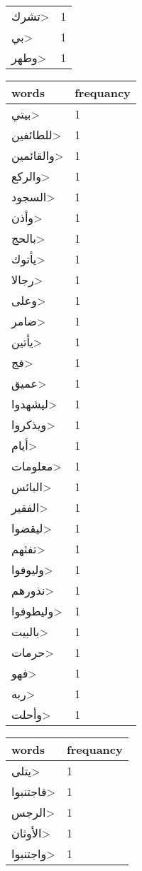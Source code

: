 \documentclass{article}
\begin{document}
\begin{multicols}{3}
\begin{center}
\begin{tabular}{ P{2cm}  P{1cm}}
\<تشرك> & 1 \\ 
\<بي> & 1 \\ 
\<وطهر> & 1 \\ 
\end{tabular} 
\begin{tabular}{ P{2cm}  P{1cm}} 
\textbf{words}    & \textbf{frequancy}  \\
\hline
\<بيتي> & 1 \\ 
\<للطائفين> & 1 \\ 
\<والقائمين> & 1 \\ 
\<والركع> & 1 \\ 
\<السجود> & 1 \\ 
\<وأذن> & 1 \\ 
\<بالحج> & 1 \\ 
\<يأتوك> & 1 \\ 
\<رجالا> & 1 \\ 
\<وعلى> & 1 \\ 
\<ضامر> & 1 \\ 
\<يأتين> & 1 \\ 
\<فج> & 1 \\ 
\<عميق> & 1 \\ 
\<ليشهدوا> & 1 \\ 
\<ويذكروا> & 1 \\ 
\<أيام> & 1 \\ 
\<معلومات> & 1 \\ 
\<البائس> & 1 \\ 
\<الفقير> & 1 \\ 
\<ليقضوا> & 1 \\ 
\<تفثهم> & 1 \\ 
\<وليوفوا> & 1 \\ 
\<نذورهم> & 1 \\ 
\<وليطوفوا> & 1 \\ 
\<بالبيت> & 1 \\ 
\<حرمات> & 1 \\ 
\<فهو> & 1 \\ 
\<ربه> & 1 \\ 
\<وأحلت> & 1 \\ 
\end{tabular} 
\begin{tabular}{ P{2cm}  P{1cm}} 
\textbf{words}    & \textbf{frequancy}  \\
\hline
\<يتلى> & 1 \\ 
\<فاجتنبوا> & 1 \\ 
\<الرجس> & 1 \\ 
\<الأوثان> & 1 \\ 
\<واجتنبوا> & 1 \\ 

\end{tabular}
\end{center}
\end{multicols}
\end{document}
